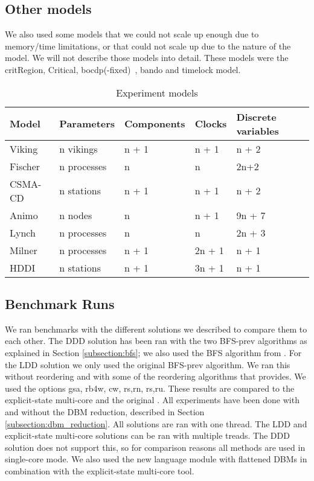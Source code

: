 \subsection{Other models}
We also used some models that we could not scale up enough due to memory/time limitations, or that could not scale up due to the nature of the model. We will not describe those models into detail. These models were the critRegion, Critical, bocdp(-fixed)~\cite{641264}, bando and timelock model.

\begin{table}
\label{tab:experiments-variables}
    \begin{tabular}{|l|l|l|l|l|}
    \hline
     Model  & Parameters  & Components & Clocks & Discrete variables \\ \hline
    Viking  & n vikings   & n + 1      & n + 1  & n + 2              \\
    Fischer & n processes & n          & n      & 2n+2               \\
    CSMA-CD & n stations  & n + 1      & n + 1  & n + 2              \\
    Animo   & n nodes     & n          & n + 1  & 9n + 7             \\
    Lynch   & n processes & n          & n      & 2n + 3             \\
    Milner  & n processes & n + 1      & 2n + 1 & n + 1              \\
    HDDI    & n stations  & n + 1      & 3n + 1 & n + 1              \\ \hline
    \end{tabular}
\caption{Experiment models}
\end{table}

\subsection{Benchmark Runs}
We ran benchmarks with the different solutions we described to compare them to each other. The DDD solution has been ran with the two BFS-prev algorithms as explained in Section \ref{subsection:bfs}; we also used the BFS algorithm from \ltsmin{}. For the LDD solution we only used the original BFS-prev algorithm. We ran this without reordering and with some of the reordering algorithms that \ltsmin{} provides. We used the options gsa, rb4w, cw, rs,rn, rs,ru. These results are compared to the explicit-state multi-core \ltsmin{} and the original \uppaal{}. All experiments have been done with and without the DBM reduction, described in Section \ref{subsection:dbm_reduction}. All solutions are ran with one thread. The LDD and explicit-state multi-core solutions can be ran with multiple treads. The DDD solution does not support this, so for comparison reasons all methods are used in single-core mode. We also used the new language module with flattened DBMs in combination with the explicit-state multi-core tool.
